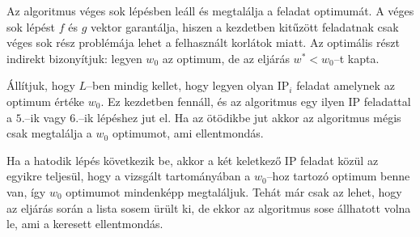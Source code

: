 Az algoritmus véges sok lépésben leáll és megtalálja a feladat optimumát. A
véges sok lépést $f$ és $g$ vektor garantálja, hiszen a kezdetben kitűzött
feladatnak csak véges sok rész problémája lehet a felhasznált korlátok miatt. Az
optimális részt indirekt bizonyítjuk: legyen $w_0$ az optimum, de az eljárás
$w^*<w_0$--t kapta.

Állítjuk, hogy $L$--ben mindig kellet, hogy legyen olyan IP$_i$ feladat amelynek
az optimum értéke $w_0$. Ez kezdetben fennáll, és az algoritmus egy ilyen IP
feladattal a $5.$--ik vagy $6.$--ik lépéshez jut el. Ha az ötödikbe jut akkor az
algoritmus mégis csak megtalálja a $w_0$ optimumot, ami ellentmondás.

Ha a hatodik lépés következik be, akkor a két keletkező IP feladat közül az
egyikre teljesül, hogy a vizsgált tartományában a $w_0$--hoz tartozó optimum
benne van, így $w_0$ optimumot mindenképp megtaláljuk. Tehát már csak az lehet,
hogy az eljárás során a lista sosem ürült ki, de ekkor az algoritmus sose
állhatott volna le, ami a keresett ellentmondás.

